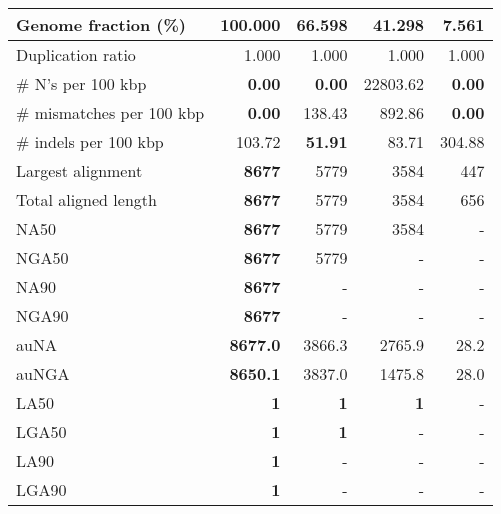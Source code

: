 \documentclass[12pt,a4paper]{article}
\begin{document}
\begin{table}[ht]
\begin{center}
\begin{tabular}{|l*{4}{|r}|}
Genome fraction (\%) & {\bf 100.000} & 66.598 & 41.298 & 7.561 \\ \hline
Duplication ratio & 1.000 & 1.000 & 1.000 & 1.000 \\ \hline
\# N's per 100 kbp & {\bf 0.00} & {\bf 0.00} & 22803.62 & {\bf 0.00} \\ \hline
\# mismatches per 100 kbp & {\bf 0.00} & 138.43 & 892.86 & {\bf 0.00} \\ \hline
\# indels per 100 kbp & 103.72 & {\bf 51.91} & 83.71 & 304.88 \\ \hline
Largest alignment & {\bf 8677} & 5779 & 3584 & 447 \\ \hline
Total aligned length & {\bf 8677} & 5779 & 3584 & 656 \\ \hline
NA50 & {\bf 8677} & 5779 & 3584 & - \\ \hline
NGA50 & {\bf 8677} & 5779 & - & - \\ \hline
NA90 & {\bf 8677} & - & - & - \\ \hline
NGA90 & {\bf 8677} & - & - & - \\ \hline
auNA & {\bf 8677.0} & 3866.3 & 2765.9 & 28.2 \\ \hline
auNGA & {\bf 8650.1} & 3837.0 & 1475.8 & 28.0 \\ \hline
LA50 & {\bf 1} & {\bf 1} & {\bf 1} & - \\ \hline
LGA50 & {\bf 1} & {\bf 1} & - & - \\ \hline
LA90 & {\bf 1} & - & - & - \\ \hline
LGA90 & {\bf 1} & - & - & - \\ \hline
\end{tabular}
\end{center}
\end{table}
\end{document}
